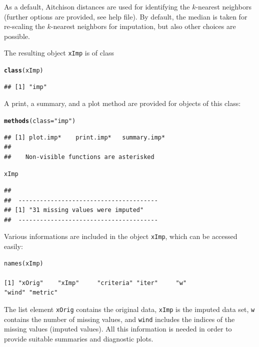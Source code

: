 \documentclass{scrartcl}\usepackage[]{graphicx}\usepackage[]{color}
\makeatletter
\newcommand{\hlstr}[1]{\textcolor[rgb]{0.192,0.494,0.8}{#1}}%
\newcommand{\hlstd}[1]{\textcolor[rgb]{0.345,0.345,0.345}{#1}}%
\newcommand{\hlkwc}[1]{\textcolor[rgb]{0.333,0.667,0.333}{#1}}%
\newcommand{\hlkwd}[1]{\textcolor[rgb]{0.737,0.353,0.396}{\textbf{#1}}}%
\newenvironment{kframe}{%
 \def\at@end@of@kframe{}%
 \ifinner\ifhmode%
  \def\at@end@of@kframe{\end{minipage}}%
  \begin{minipage}{\columnwidth}%
 \fi\fi%
 \def\FrameCommand##1{\hskip\@totalleftmargin \hskip-\fboxsep
 \colorbox{shadecolor}{##1}\hskip-\fboxsep
     \hskip-\linewidth \hskip-\@totalleftmargin \hskip\columnwidth}%
 \MakeFramed {\advance\hsize-\width
   \@totalleftmargin\z@ \linewidth\hsize
   \@setminipage}}%
 {\par\unskip\endMakeFramed%
 \at@end@of@kframe}
\newenvironment{knitrout}{}{} %
\makeatother
\begin{document}
As a default, Aitchison distances are used for identifying the $k$-nearest neighbors
(further options are provided, see help file). By default, the median is
taken for re-scaling the $k$-nearest neighbors for imputation, but also other
choices are possible.

The resulting object \texttt{xImp} is of class
\begin{knitrout}
\color{fgcolor}\begin{kframe}
\begin{alltt}
\hlkwd{class}\hlstd{(xImp)}
\end{alltt}
\begin{verbatim}
## [1] "imp"
\end{verbatim}
\end{kframe}
\end{knitrout}

A print, a summary, and a plot method are provided for objects of this class:
\begin{knitrout}
\color{fgcolor}\begin{kframe}
\begin{alltt}
\hlkwd{methods}\hlstd{(}\hlkwc{class} \hlstd{=} \hlstr{"imp"}\hlstd{)}
\end{alltt}
\begin{verbatim}
## [1] plot.imp*    print.imp*   summary.imp*
## 
##    Non-visible functions are asterisked
\end{verbatim}
\begin{alltt}
\hlstd{xImp}
\end{alltt}
\begin{verbatim}
## 
##  --------------------------------------- 
## [1] "31 missing values were imputed"
##  ---------------------------------------
\end{verbatim}
\end{kframe}
\end{knitrout}

Various informations are included in the object \texttt{xImp}, which can be accessed easily:

\begin{verbatim}
names(xImp)

[1] "xOrig"    "xImp"     "criteria" "iter"     "w"
"wind" "metric"
\end{verbatim} 

The list element \texttt{xOrig} contains the original data, \texttt{xImp}
is the imputed data set, \texttt{w} contains the number of missing values,
and \texttt{wind} includes the indices of the missing values
(imputed values).
All this information is needed in order to provide suitable summaries and
diagnostic plots.
\end{document}
